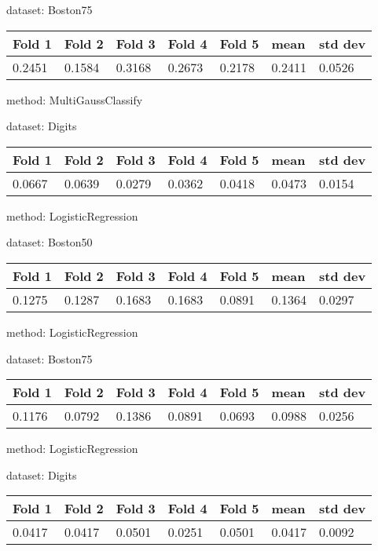 \documentclass{article}
\begin{document}
\noindent dataset: Boston75

\begin{center}
	\begin{tabular}  { | l | l | l | l | l | l | l | }
	\hline
	Fold 1 & Fold 2 & Fold 3 & Fold 4 & Fold 5 & mean & std dev\\ \hline
	0.2451 & 0.1584 & 0.3168 & 0.2673 & 0.2178 & 0.2411 & 0.0526\\
	\hline
	\end{tabular}
\end{center}
\noindent method: MultiGaussClassify

\noindent dataset: Digits

\begin{center}
	\begin{tabular}  { | l | l | l | l | l | l | l | }
	\hline
	Fold 1 & Fold 2 & Fold 3 & Fold 4 & Fold 5 & mean & std dev\\ \hline
	0.0667 & 0.0639 & 0.0279 & 0.0362 & 0.0418 & 0.0473 & 0.0154\\
	\hline
	\end{tabular}
\end{center}
\noindent method: LogisticRegression

\noindent dataset: Boston50

\begin{center}
	\begin{tabular}  { | l | l | l | l | l | l | l | }
	\hline
	Fold 1 & Fold 2 & Fold 3 & Fold 4 & Fold 5 & mean & std dev\\ \hline
	0.1275 & 0.1287 & 0.1683 & 0.1683 & 0.0891 & 0.1364 & 0.0297\\
	\hline
	\end{tabular}
\end{center}
\noindent method: LogisticRegression

\noindent dataset: Boston75

\begin{center}
	\begin{tabular}  { | l | l | l | l | l | l | l | }
	\hline
	Fold 1 & Fold 2 & Fold 3 & Fold 4 & Fold 5 & mean & std dev\\ \hline
	0.1176 & 0.0792 & 0.1386 & 0.0891 & 0.0693 & 0.0988 & 0.0256\\
	\hline
	\end{tabular}
\end{center}
\noindent method: LogisticRegression

\noindent dataset: Digits

\begin{center}
	\begin{tabular}  { | l | l | l | l | l | l | l | }
	\hline
	Fold 1 & Fold 2 & Fold 3 & Fold 4 & Fold 5 & mean & std dev\\ \hline
	0.0417 & 0.0417 & 0.0501 & 0.0251 & 0.0501 & 0.0417 & 0.0092\\
	\hline
	\end{tabular}
\end{center}
\end{document}

